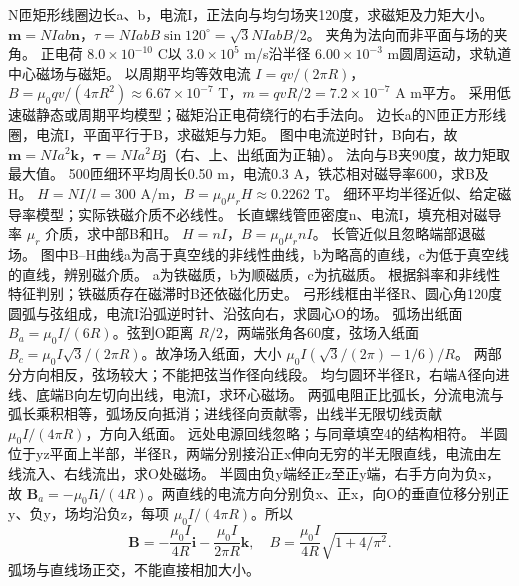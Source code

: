 \problemtext N匝矩形线圈边长a、b，电流I，正法向与均匀场夹120度，求磁矩及力矩大小。
\workings $\bm m=NIab\bm n$，$\tau=NIabB\sin120^\circ=\sqrt3NIabB/2$。
\crosscheck 夹角为法向而非平面与场的夹角。
\problemtext 正电荷 $8.0\times10^{-10}$ C以 $3.0\times10^5$ m/s沿半径 $6.00\times10^{-3}$ m圆周运动，求轨道中心磁场与磁矩。
\workings 以周期平均等效电流 $I=qv/(2\pi R)$，$B=\mu_0qv/(4\pi R^2)\approx6.67\times10^{-7}$ T，$m=qvR/2=7.2\times10^{-7}$ A m平方。
\crosscheck 采用低速磁静态或周期平均模型；磁矩沿正电荷绕行的右手法向。
\problemtext 边长a的N匝正方形线圈，电流I，平面平行于B，求磁矩与力矩。
\workings 图中电流逆时针，B向右，故 $\bm m=NIa^2\bm k$，$\bm\tau=NIa^2B\bm j$（右、上、出纸面为正轴）。
\crosscheck 法向与B夹90度，故力矩取最大值。
\problemtext 500匝细环平均周长0.50 m，电流0.3 A，铁芯相对磁导率600，求B及H。
\workings $H=NI/l=300$ A/m，$B=\mu_0\mu_rH\approx0.2262$ T。
\crosscheck 细环平均半径近似、给定磁导率模型；实际铁磁介质不必线性。
\problemtext 长直螺线管匝密度n、电流I，填充相对磁导率 $\mu_r$ 介质，求中部B和H。
\workings $H=nI$，$B=\mu_0\mu_r nI$。
\crosscheck 长管近似且忽略端部退磁场。
\problemtext 图中B--H曲线a为高于真空线的非线性曲线，b为略高的直线，c为低于真空线的直线，辨别磁介质。
\workings a为铁磁质，b为顺磁质，c为抗磁质。
\crosscheck 根据斜率和非线性特征判别；铁磁质存在磁滞时B还依磁化历史。
\problemtext 弓形线框由半径R、圆心角120度圆弧与弦组成，电流I沿弧逆时针、沿弦向右，求圆心O的场。
\workings 弧场出纸面 $B_a=\mu_0I/(6R)$。弦到O距离 $R/2$，两端张角各60度，弦场入纸面 $B_c=\mu_0I\sqrt3/(2\pi R)$。故净场入纸面，大小 $\mu_0I(\sqrt3/(2\pi)-1/6)/R$。
\crosscheck 两部分方向相反，弦场较大；不能把弦当作径向线段。
\problemtext 均匀圆环半径R，右端A径向进线、底端B向左切向出线，电流I，求环心磁场。
\workings 两弧电阻正比弧长，分流电流与弧长乘积相等，弧场反向抵消；进线径向贡献零，出线半无限切线贡献 $\mu_0I/(4\pi R)$，方向入纸面。
\crosscheck 远处电源回线忽略；与同章填空4的结构相符。
\problemtext 半圆位于yz平面上半部，半径R，两端分别接沿正x伸向无穷的半无限直线，电流由左线流入、右线流出，求O处磁场。
\workings 半圆由负y端经正z至正y端，右手方向为负x，故 $\bm B_a=-\mu_0I\bm i/(4R)$。两直线的电流方向分别负x、正x，向O的垂直位移分别正y、负y，场均沿负z，每项 $\mu_0I/(4\pi R)$。所以
\[
\bm B=-\frac{\mu_0I}{4R}\bm i-\frac{\mu_0I}{2\pi R}\bm k,\quad
B=\frac{\mu_0I}{4R}\sqrt{1+4/\pi^2}.
\]
\crosscheck 弧场与直线场正交，不能直接相加大小。

